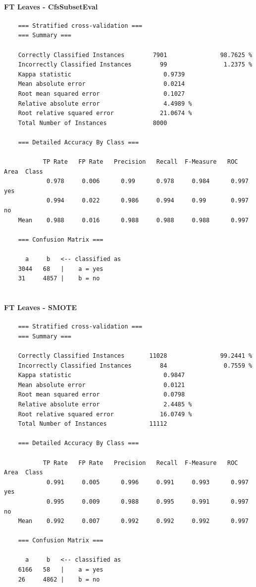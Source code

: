 \paragraph{FT Leaves - CfsSubsetEval}
{\footnotesize
	\begin{verbatim}
	=== Stratified cross-validation ===
	=== Summary ===
	
	Correctly Classified Instances        7901               98.7625 %
	Incorrectly Classified Instances        99                1.2375 %
	Kappa statistic                          0.9739
	Mean absolute error                      0.0214
	Root mean squared error                  0.1027
	Relative absolute error                  4.4989 %
	Root relative squared error             21.0674 %
	Total Number of Instances             8000     
	
	=== Detailed Accuracy By Class ===
	
	       TP Rate   FP Rate   Precision   Recall  F-Measure   ROC Area  Class
	        0.978     0.006      0.99      0.978     0.984      0.997    yes
	        0.994     0.022      0.986     0.994     0.99       0.997    no
	Mean    0.988     0.016      0.988     0.988     0.988      0.997
	
	=== Confusion Matrix ===
	
	  a     b   <-- classified as
	3044   68   |    a = yes
	31     4857 |    b = no
	
	\end{verbatim}
}

\paragraph{FT Leaves - SMOTE}
{\footnotesize
	\begin{verbatim}
	=== Stratified cross-validation ===
	=== Summary ===
	
	Correctly Classified Instances       11028               99.2441 %
	Incorrectly Classified Instances        84                0.7559 %
	Kappa statistic                          0.9847
	Mean absolute error                      0.0121
	Root mean squared error                  0.0798
	Relative absolute error                  2.4485 %
	Root relative squared error             16.0749 %
	Total Number of Instances            11112     
	
	=== Detailed Accuracy By Class ===
	
	       TP Rate   FP Rate   Precision   Recall  F-Measure   ROC Area  Class
	        0.991     0.005      0.996     0.991     0.993      0.997    yes
	        0.995     0.009      0.988     0.995     0.991      0.997    no
	Mean    0.992     0.007      0.992     0.992     0.992      0.997
	
	=== Confusion Matrix ===
	
	  a     b   <-- classified as
	6166   58   |    a = yes
	26     4862 |    b = no
	\end{verbatim}
}

